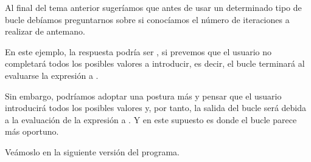\documentclass[letterpaper,10pt,english]{sphinxmanual}
\begin{document}

Al final del tema anterior sugeríamos que antes de usar un determinado
tipo de bucle debíamos preguntarnos sobre si conocíamos el número de
iteraciones a realizar de antemano.

En este ejemplo, la respuesta podría
ser , si prevemos que el usuario no completará todos los posibles
valores a introducir, es decir, el bucle  terminará al evaluarse
la expresión  a .

Sin embargo, podríamos adoptar una postura más  y pensar que
el usuario introducirá todos los posibles valores y, por tanto, la salida
del bucle  será debida a la evaluación de la expresión
 a . Y en este supuesto es donde el bucle 
parece más oportuno.

Veámoslo en la siguiente versión del programa.

\newpage

   
\end{document}
